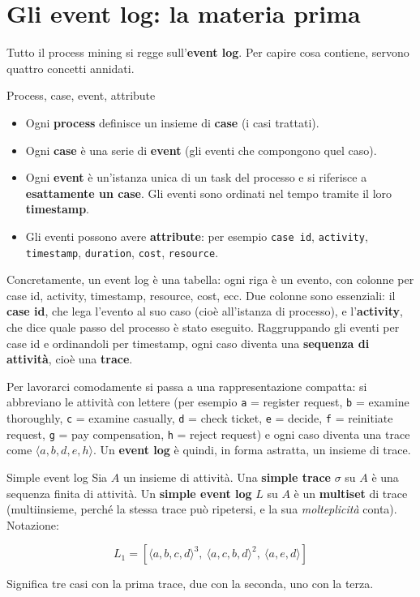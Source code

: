 \section{\texorpdfstring{Gli event log: la materia prima}{Gli event log: la materia prima}}

Tutto il process mining si regge sull'\textbf{event log}. Per capire cosa contiene, servono quattro concetti annidati.

\begin{boxdefinition}{Process, case, event, attribute}
\begin{itemize}
\item Ogni \textbf{process} definisce un insieme di \textbf{case} (i casi trattati).
\item Ogni \textbf{case} è una serie di \textbf{event} (gli eventi che compongono quel caso).
\item Ogni \textbf{event} è un'istanza unica di un task del processo e si riferisce a \textbf{esattamente un case}. Gli eventi sono ordinati nel tempo tramite il loro \textbf{timestamp}.
\item Gli eventi possono avere \textbf{attribute}: per esempio \texttt{case id}, \texttt{activity}, \texttt{timestamp}, \texttt{duration}, \texttt{cost}, \texttt{resource}.
\end{itemize}
\end{boxdefinition}

Concretamente, un event log è una tabella: ogni riga è un evento, con colonne per case id, activity, timestamp, resource, cost, ecc. Due colonne sono essenziali: il \textbf{case id}, che lega l'evento al suo caso (cioè all'istanza di processo), e l'\textbf{activity}, che dice quale passo del processo è stato eseguito. Raggruppando gli eventi per case id e ordinandoli per timestamp, ogni caso diventa una \textbf{sequenza di attività}, cioè una \textbf{trace}.

Per lavorarci comodamente si passa a una rappresentazione compatta: si abbreviano le attività con lettere (per esempio \texttt{a} = register request, \texttt{b} = examine thoroughly, \texttt{c} = examine casually, \texttt{d} = check ticket, \texttt{e} = decide, \texttt{f} = reinitiate request, \texttt{g} = pay compensation, \texttt{h} = reject request) e ogni caso diventa una trace come $\langle a,b,d,e,h \rangle$. Un \textbf{event log} è quindi, in forma astratta, un insieme di trace.

\begin{boxdefinition}{Simple event log}
Sia $A$ un insieme di attività. Una \textbf{simple trace} $\sigma$ su $A$ è una sequenza finita di attività. Un \textbf{simple event log} $L$ su $A$ è un \textbf{multiset} di trace (multiinsieme, perché la stessa trace può ripetersi, e la sua \emph{molteplicità} conta). Notazione:

\[
L_1 = [\langle a,b,c,d\rangle^3,\ \langle a,c,b,d\rangle^2,\ \langle a,e,d\rangle]
\]

Significa tre casi con la prima trace, due con la seconda, uno con la terza.
\end{boxdefinition}

